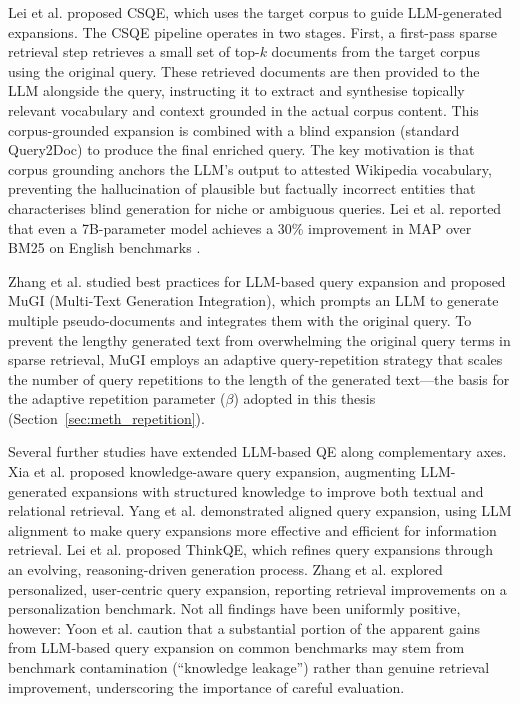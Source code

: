 Lei et al. \cite{lei_2024_csqe} proposed CSQE, which uses the target corpus to guide LLM-generated expansions. The CSQE pipeline operates in two stages. First, a first-pass sparse retrieval step retrieves a small set of top-$k$ documents from the target corpus using the original query. These retrieved documents are then provided to the LLM alongside the query, instructing it to extract and synthesise topically relevant vocabulary and context grounded in the actual corpus content. This corpus-grounded expansion is combined with a blind expansion (standard Query2Doc) to produce the final enriched query. The key motivation is that corpus grounding anchors the LLM's output to attested Wikipedia vocabulary, preventing the hallucination of plausible but factually incorrect entities that characterises blind generation for niche or ambiguous queries. Lei et al. reported that even a 7B-parameter model achieves a 30\% improvement in MAP over BM25 on English benchmarks \cite{lei_2024_csqe}.

Zhang et al. \cite{zhang_2024_mugi} studied best practices for LLM-based query expansion and proposed MuGI (Multi-Text Generation Integration), which prompts an LLM to generate multiple pseudo-documents and integrates them with the original query. To prevent the lengthy generated text from overwhelming the original query terms in sparse retrieval, MuGI employs an adaptive query-repetition strategy that scales the number of query repetitions to the length of the generated text---the basis for the adaptive repetition parameter ($\beta$) adopted in this thesis (Section~\ref{sec:meth_repetition}).

Several further studies have extended LLM-based QE along complementary axes. Xia et al. \cite{xia_2025_kar} proposed knowledge-aware query expansion, augmenting LLM-generated expansions with structured knowledge to improve both textual and relational retrieval. Yang et al. \cite{yang_2025_aqe} demonstrated aligned query expansion, using LLM alignment to make query expansions more effective and efficient for information retrieval. Lei et al. \cite{lei_2025_thinkqe} proposed ThinkQE, which refines query expansions through an evolving, reasoning-driven generation process. Zhang et al. \cite{zhang_2025_pbr} explored personalized, user-centric query expansion, reporting retrieval improvements on a personalization benchmark. Not all findings have been uniformly positive, however: Yoon et al. \cite{yoon_2025_llm_retrieval} caution that a substantial portion of the apparent gains from LLM-based query expansion on common benchmarks may stem from benchmark contamination (``knowledge leakage'') rather than genuine retrieval improvement, underscoring the importance of careful evaluation.

